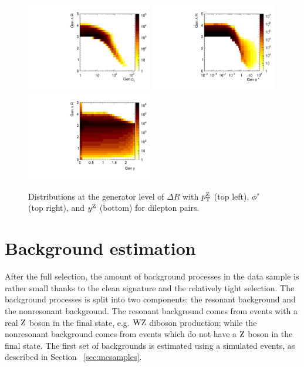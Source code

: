 \begin{figure}
	\centering
	\includegraphics[width=0.49\textwidth]{figures/zpt/ptVdr.pdf}
	\includegraphics[width=0.49\textwidth]{figures/zpt/phiVdr.pdf}
	\includegraphics[width=0.49\textwidth]{figures/zpt/rapVdr.pdf}
	\caption{Distributions at the generator level of $\Delta R$ with $p_{\mathrm{T}}^{\mathrm{Z}}$ (top left), $\phi^\star$ (top right), and $y^{\mathrm{Z}}$ (bottom) for dilepton pairs.}
	\label{fig:gendist4}
\end{figure}

\section{Background estimation}
\label{sec:zptbkg}
After the full selection, the amount of background processes in the data sample is 
rather small thanks to the clean signature and the relatively tight selection. 
The background processes is split into two components:
the resonant background and the nonresonant background. 
The resonant background comes from events with a real $\mathrm{Z}$ boson in the final state, 
e.g. $\mathrm{W}\mathrm{Z}$ diboson production; while the nonresonant background comes from events 
which do not have a $\mathrm{Z}$ boson in the final state.
The first set of backgrounds is estimated using a simulated events, as described in 
Section ~\ref{sec:mcsamples}. 

